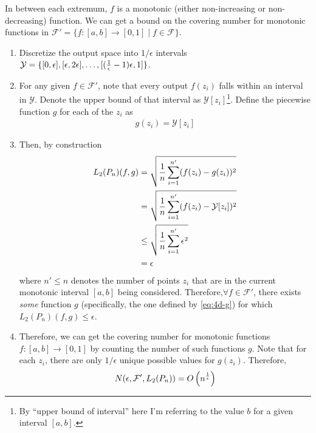 \documentclass[11pt]{article}
\newcommand{\1}{\mathbb{I}} %
\begin{document}
 In between each extremum, $f$ is a monotonic (either non-increasing or non-decreasing) function. We can get a bound on the covering number for monotonic functions in $\mathcal F' = \{f: [a, b] \to [0, 1] \mid f \in \mathcal F\} $. 
 \begin{enumerate}
 	\item  Discretize the output space into $1/\epsilon$ intervals $\mathcal Y = \{ [0, \epsilon], [\epsilon, 2\epsilon], \ldots, [(\frac{1}{\epsilon} - 1)\epsilon, 1]  \}$. 
 	
 	\item For any given $f \in \mathcal F'$, note that every output $f(z_i)$ falls within an interval in $\mathcal Y$. Denote the upper bound of that interval as $\mathcal Y[z_i]$\footnote{By ``upper bound of interval'' here I'm referring to the value $b$ for a given interval $[a, b]$.}. Define the piecewise function $g$ for each of the $z_i$ as 
 	\begin{align}
 		g(z_i) = \mathcal Y[z_i] \label{eq:4d-g}
 	\end{align}
 
 	\item Then, by construction
 	\begin{align}
 		L_2(P_n)(f, g) 
 			&= \sqrt{ \frac{1}{n} \sum_{i=1}^{n'} (f(z_i) - g(z_i))^2  } \\
 			&= \sqrt{ \frac{1}{n} \sum_{i=1}^{n'} (f(z_i) - \mathcal Y[z_i])^2  } \\
 			&\leq \sqrt{ \frac{1}{n} \sum_{i=1}^{n'} \epsilon^2 } \\
 			&= \epsilon 
 	\end{align}
 	where $n' \leq n$ denotes the number of points $z_i$ that are in the current monotonic interval $[a, b]$ being considered. Therefore,$\forall f \in \mathcal F'$,  there exists \textit{some} function $g$ (specifically, the one defined by \ref{eq:4d-g}) for which $L_2(P_n)(f, g) \leq \epsilon$. 
 	
 	\item Therefore, we can get the covering number for monotonic functions $f: [a, b] \to [0, 1]$ by counting the number of such functions $g$. Note that for each $z_i$, there are only $1/\epsilon$ unique possible values for $g(z_i)$. Therefore, 
 	\begin{align}
	 	N(\epsilon, \mathcal F', L_2(P_n)) = O\left(  n^{\frac{1}{\epsilon}}  \right)
 	\end{align}
 \end{enumerate}
\end{document}
